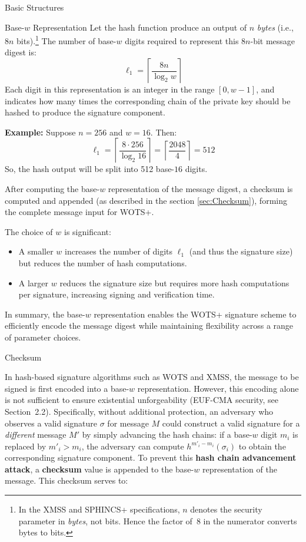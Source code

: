 \documentclass[version=preprint]{iacrcc}
\begin{document}
\begin{section}{Basic Structures}{\label{sec1}}
\begin{subsection}{Base-\texorpdfstring{$w$}{w} Representation }
Let the hash function produce an output of $n$ \emph{bytes} (i.e., $8n$ bits).\footnote{In the XMSS and SPHINCS+ specifications, $n$ denotes the security parameter in \emph{bytes}, not bits. Hence the factor of~8 in the numerator converts bytes to bits.} The number of base-$w$ digits required to represent this $8n$-bit message digest is:
\[
\ell_1 = \left\lceil \frac{8n}{\log_2 w} \right\rceil
\]
Each digit in this representation is an integer in the range $[0, w-1]$, and indicates how many times the corresponding chain of the private key should be hashed to produce the signature component.

\textbf{Example:}  
Suppose $n = 256$ and $w = 16$. Then:
\[
\ell_1 = \left\lceil \frac{8 \cdot 256}{\log_2 16} \right\rceil = \left\lceil \frac{2048}{4} \right\rceil = 512
\]
So, the hash output will be split into 512 base-$16$ digits.

After computing the base-$w$ representation of the message digest, a checksum is computed and appended (as described in the section \ref{sec:Checksum}), forming the complete message input for WOTS+.

The choice of $w$ is significant: 
\begin{itemize}
    \item A smaller $w$ increases the number of digits $\ell_1$ (and thus the signature size) but reduces the number of hash computations.
    \item A larger $w$ reduces the signature size but requires more hash computations per signature, increasing signing and verification time.
\end{itemize}

In summary, the base-$w$ representation enables the WOTS+ signature scheme to efficiently encode the message digest while maintaining flexibility across a range of parameter choices.

\end{subsection}


\begin{subsection}{Checksum}{\label{sec:Checksum}}

In hash-based signature algorithms such as WOTS and XMSS, the message to be signed is first encoded into a base-$w$ representation. However, this encoding alone is not sufficient to ensure existential unforgeability (EUF-CMA security, see Section~2.2). Specifically, without additional protection, an adversary who observes a valid signature $\sigma$ for message $M$ could construct a valid signature for a \emph{different} message $M'$ by simply advancing the hash chains: if a base-$w$ digit $m_i$ is replaced by $m'_i > m_i$, the adversary can compute $h^{m'_i - m_i}(\sigma_i)$ to obtain the corresponding signature component. To prevent this \textbf{hash chain advancement attack}, a \textbf{checksum} value is appended to the base-$w$ representation of the message. This checksum serves to:


\end{subsection}
\end{section}
\end{document}
